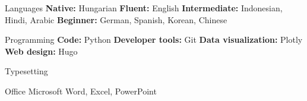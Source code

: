 
\begin{cvskills}
   
  \cvskill
    {Languages}
    {\textbf{Native:} Hungarian \textbf{Fluent:} English \textbf{Intermediate:} Indonesian, Hindi, Arabic \textbf{Beginner:} German, Spanish, Korean, Chinese} %
    
  \cvskill
    {Programming}
    {\textbf{Code:} Python \textbf{Developer tools:} Git \textbf{Data visualization:} Plotly \textbf{Web design:} Hugo} %

  \cvskill
    {Typesetting}
    {\textrm{}}

  \cvskill
    {Office}
    {Microsoft Word, Excel, PowerPoint}
 
\end{cvskills}
